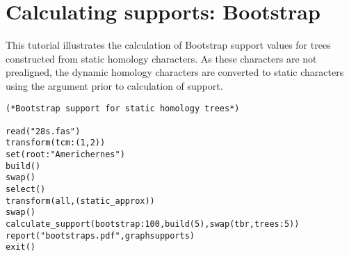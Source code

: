
\section{Calculating supports: Bootstrap}{\label{tutorial6}}

This tutorial illustrates the calculation of Bootstrap support 
values for trees constructed from static homology characters. 
As these characters are not prealigned, the dynamic homology 
characters are converted to static characters using the argument 
 prior to calculation of support.

\begin{verbatim}
(*Bootstrap support for static homology trees*)

read("28s.fas")
transform(tcm:(1,2))
set(root:"Americhernes")
build()
swap()
select()
transform(all,(static_approx))
swap()
calculate_support(bootstrap:100,build(5),swap(tbr,trees:5))
report("bootstraps.pdf",graphsupports)
exit()
\end{verbatim}

